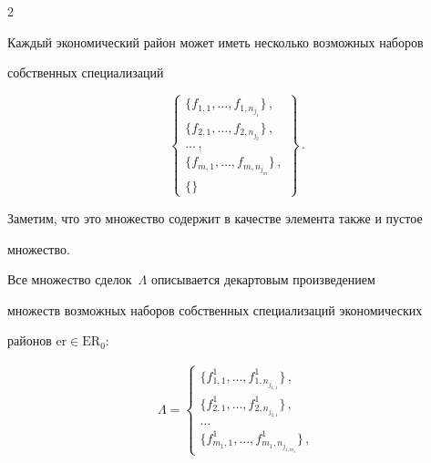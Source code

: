\begin{multicols}{2}
  


  Каждый экономический район может иметь несколько возможных наборов 


собственных специализаций





\noindent


  $$


  \left \{


  \begin{matrix}


  \{f_{1,1}, \ldots , f_{1,n_{j_1}}\}\,,\\


  \{f_{2,1}, \ldots , f_{2,n_{j_2}}\}\,,\\


  \ldots\,,\\


  \{f_{m,1}, \ldots , f_{m,n_{j_m}}\}\,,\\


  \{\}


  \end{matrix}


  \right \}\,.


  $$


  


  Заметим, что это множество содержит в качестве элемента также и пустое 


множество.


  


  Все множество сделок~$\Lambda$ описывается декартовым произведением 


множеств возможных наборов собственных специализаций экономических 


районов $\mathrm{er}\in \mathrm{ER}_0$:


\begin{multline*}


  \Lambda = \left \{


  \begin{matrix}


  \{f^1_{1,1}, \ldots , f^1_{1,n_{j_{1,1}}}\}\,,\\


  \{f^1_{2,1}, \ldots , f^1_{2,n_{j_{2,1}}}\}\,,\\


  \ldots\\


  \{f^1_{m_1,1}, \ldots , f^1_{m_1,n_{j_{1,m_1}}}\}\,,



\end{matrix}
\end{multline*}
\end{multicols}
